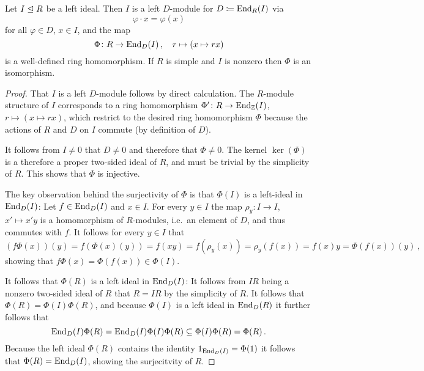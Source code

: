 \begin{lemma}
  \label{lemma: rieffels theorem}
  Let $I \trianglelefteq R$ be a left ideal.
  Then $I$ is a left $D$-module for $D \coloneqq \operatorname{End}_R(I)$ via
  \[
      \varphi \cdot x
    = \varphi(x)
  \]
  for all $\varphi \in D$, $x \in I$, and the map
  \[
            \Phi    
    \colon  R
    \to     \operatorname{End}_D(I)\,,
    \quad   r
    \mapsto (x \mapsto rx)
  \]
  is a well-defined ring homomorphism.
  If $R$ is simple and $I$ is nonzero then $\Phi$ is an isomorphism.
\end{lemma}


\begin{proof}
  That $I$ is a left $D$-module follows by direct calculation.
  The $R$-module structure of $I$ corresponds to a ring homomorphism $\Phi' \colon R \to \operatorname{End}_{\mathbb{Z}}(I)$, $r \mapsto (x \mapsto rx)$, which restrict to the desired ring homomorphism $\Phi$ because the actions of $R$ and $D$ on $I$ commute (by definition of $D$).
  
  It follows from $I \neq 0$ that $D \neq 0$ and therefore that $\Phi \neq 0$.
  The kernel $\ker(\Phi)$ is a therefore a proper two-sided ideal of $R$, and must be trivial by the simplicity of $R$.
  This shows that $\Phi$ is injective.
  
  The key observation behind the surjectivity of $\Phi$ is that $\Phi(I)$ is a left-ideal in $\operatorname{End}_D(I)$:
  Let $f \in \operatorname{End}_D(I)$ and $x \in I$.
  For every $y \in I$ the map $\rho_y \colon I \to I$, $x' \mapsto x'y$ is a homomorphism of $R$-modules, i.e.\ an element of $D$, and thus commutes with $f$.
  It follows for every $y \in I$ that
  \[
      (f \Phi(x))(y)
    = f(\Phi(x)(y))
    = f(xy)
    = f(\rho_y(x))
    = \rho_y(f(x))
    = f(x)y
    = \Phi(f(x))(y) \,,
  \]
  showing that $f \Phi(x) = \Phi(f(x)) \in \Phi(I)$.
  
  It follows that $\Phi(R)$ is a left ideal in $\operatorname{End}_D(I)$:
  It follows from $IR$ being a nonzero two-sided ideal of $R$ that $R = IR$ by the simplicity of $R$.
  It follows that $\Phi(R) = \Phi(I)\Phi(R)$, and because $\Phi(I)$ is a left ideal in $\operatorname{End}_D(R)$ it further follows that
  \[
              \operatorname{End}_D(I) \Phi(R)
    =         \operatorname{End}_D(I) \Phi(I) \Phi(R)
    \subseteq \Phi(I) \Phi(R)
    =         \Phi(R) \,.
  \]
  Because the left ideal $\Phi(R)$ contains the identity $1_{\operatorname{End}_D(I)} = \Phi(1)$ it follows that $\Phi(R) = \operatorname{End}_D(I)$, showing the surjecitvity of $R$.
\end{proof}


